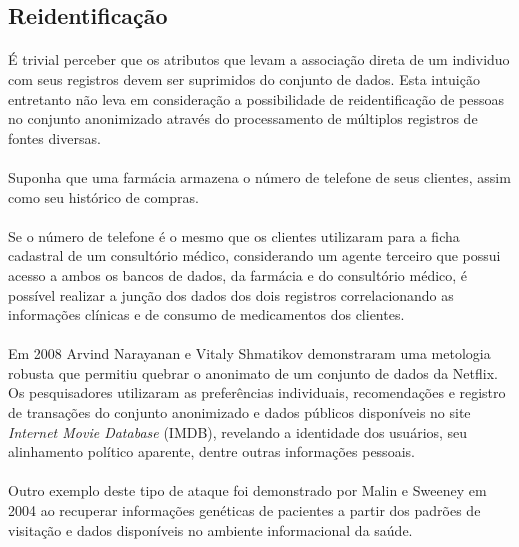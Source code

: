 \subsection{Reidentificação}

\paragraph{} É trivial perceber que os atributos que levam a associação direta de um individuo com seus registros devem ser suprimidos do conjunto de dados. Esta intuição entretanto não leva em consideração a possibilidade de reidentificação de pessoas no conjunto anonimizado através do processamento de múltiplos registros de fontes diversas. 

\paragraph{} Suponha que uma farmácia armazena o número de telefone 
de seus clientes, assim como seu histórico de compras. 

\paragraph{} Se o número de telefone é o mesmo que os clientes utilizaram para a ficha cadastral de um consultório médico, considerando um agente terceiro que possui acesso a ambos os bancos de dados, da farmácia e do 
consultório médico, é possível realizar a junção dos dados dos dois registros correlacionando as informações clínicas e de consumo de medicamentos dos clientes. 

\paragraph{} Em 2008 Arvind Narayanan e Vitaly Shmatikov demonstraram uma metologia robusta\cite{netflixDeanon}  que permitiu quebrar o anonimato de um conjunto de dados da Netflix. Os pesquisadores utilizaram as preferências individuais, recomendações e registro de transações do conjunto anonimizado e dados públicos disponíveis no site \textit{Internet Movie Database} (IMDB), revelando a identidade dos usuários, seu alinhamento político aparente, dentre outras informações pessoais.

\paragraph{} Outro exemplo deste tipo de ataque foi demonstrado por Malin e Sweeney\cite{malin2004} em 2004 ao recuperar informações genéticas de pacientes a partir dos padrões de visitação e dados disponíveis no ambiente informacional da saúde.


